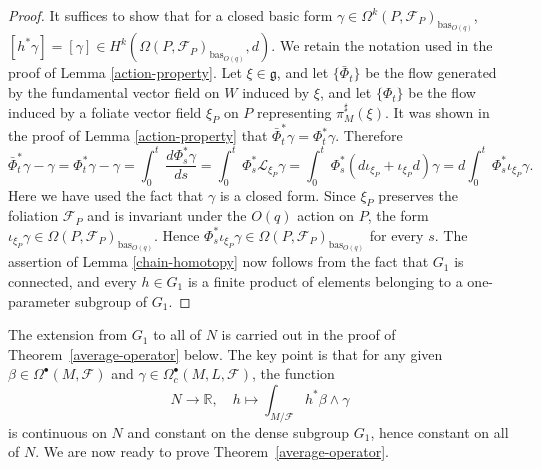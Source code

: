 \documentclass[reqno, 11pt]{amsart}
\theoremstyle{definition}
\theoremstyle{property}
\theoremstyle{remark}
\numberwithin{equation}{section}
\begin{document}
\begin{proof} It suffices to show that for a closed basic form $\gamma \in \Omega^k(P, \mathcal{F}_P)_{\text{bas}_{O(q)}}$, $[h^*\gamma]=[\gamma]\in H^k(\Omega(P, \mathcal{F}_P)_{\text{bas}_{O(q)}}, d)$. We retain the notation used in the proof of Lemma \ref{action-property}. Let  $\xi \in \mathfrak{g}$, and let 
$\{\bar{\Phi}_t\}$ be the flow generated by the fundamental vector field on $W$ induced by $\xi$, and let $\{\Phi_t\}$ be the flow induced by a foliate vector field $\xi_P$ on $P$ representing $\pi^{\sharp}_M(\xi)$.  It was shown in the proof of Lemma \ref{action-property} that $\bar{\Phi}_t^*\gamma =\Phi_t^*\gamma$. Therefore
\[ \bar{\Phi}_t^*\gamma -\gamma =\Phi_t^*\gamma -\gamma
= \int_0^t\, \dfrac{d \Phi_s^*\gamma}{ds}
= \int_0^t\, \Phi^*_s\mathcal{L}_{\xi_P} \gamma 
=\int_0^t\, \Phi^*_s(d\iota_{\xi_P}+ \iota_{\xi_P} d)\gamma
=d\int_0^t\, \Phi^*_s\iota_{\xi_P}\gamma.
\]
Here we have used the fact that $\gamma$ is a closed form. Since $\xi_P$ preserves the foliation $\mathcal{F}_P$ and is invariant under the $O(q)$ action on $P$, the form $\iota_{\xi_P}\gamma\in \Omega(P, \mathcal{F}_P)_{\text{bas}_{O(q)}}$. Hence $\Phi^*_s\iota_{\xi_P}\gamma \in \Omega(P, \mathcal{F}_P)_{\text{bas}_{O(q)}}$  for every $s$. The assertion of Lemma \ref{chain-homotopy} now follows from the fact that $G_1$ is connected, and every $h\in G_1$
is a finite product of elements belonging to a one-parameter subgroup of $G_1$.

\end{proof}


The extension from $G_1$ to all of $N$ is carried out in the proof
of Theorem~\ref{average-operator} below. The key point is that for any given
$\beta \in \Omega^\bullet(M, \mathcal{F})$ and
$\gamma \in \Omega^\bullet_c(M, L,\mathcal{F})$, the function
\begin{equation}\label{continuity}
N \to \mathbb{R}, \quad h \mapsto \int_{M/\mathcal{F}} h^*\beta \wedge \gamma
\end{equation}
is continuous on $N$ and constant on the dense subgroup $G_1$, hence constant
on all of $N$. We are now ready to prove Theorem~\ref{average-operator}.
\end{document}

